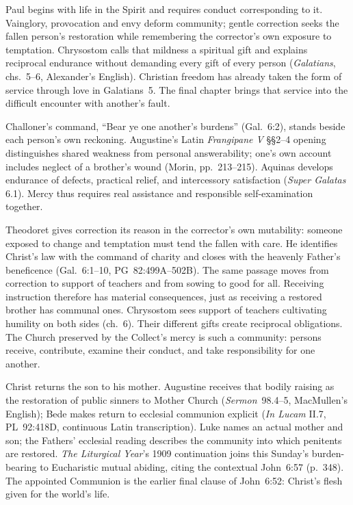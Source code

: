 Paul begins with life in the Spirit and requires conduct corresponding to
it. Vainglory, provocation and envy deform community; gentle correction
seeks the fallen person's restoration while remembering the corrector's
own exposure to temptation. Chrysostom calls that mildness a spiritual
gift and explains reciprocal endurance without demanding every gift of
every person (\emph{Galatians}, chs.~5--6, Alexander's English). Christian
freedom has already taken the form of service through love in Galatians~5.
The final chapter brings that service into the difficult encounter with
another's fault.

Challoner's command, ``Bear ye one another's burdens'' (Gal.~6:2), stands
beside each person's own reckoning. Augustine's Latin \emph{Frangipane V}
§§2--4 opening distinguishes shared weakness from personal answerability;
one's own account includes neglect of a brother's wound (Morin,
pp.~213--215). Aquinas develops endurance of defects, practical relief, and
intercessory satisfaction (\emph{Super Galatas} 6.1). Mercy thus requires
real assistance and responsible self-examination together.

Theodoret gives correction its reason in the corrector's own mutability:
someone exposed to change and temptation must tend the fallen with care.
He identifies Christ's law with the command of charity and closes with
the heavenly Father's beneficence (Gal.~6:1--10, PG~82:499A--502B).
The same passage moves from correction to support of teachers and from
sowing to good for all. Receiving instruction therefore has material
consequences, just as receiving a restored brother has communal ones.
Chrysostom sees support of teachers cultivating humility on both sides
(ch.~6). Their different gifts create reciprocal obligations. The Church
preserved by the Collect's mercy is such a community: persons receive,
contribute, examine their conduct, and take responsibility for one another.

Christ returns the son to his mother. Augustine receives that bodily
raising as the restoration of public sinners to Mother Church
(\emph{Sermon}~98.4--5, MacMullen's English); Bede makes return to
ecclesial communion explicit (\emph{In Lucam} II.7, PL~92:418D,
continuous Latin transcription). Luke names an actual mother and son;
the Fathers' ecclesial reading describes the community into which penitents
are restored. \emph{The Liturgical Year}'s 1909 continuation joins this
Sunday's burden-bearing to Eucharistic mutual abiding, citing the
contextual John~6:57 (p.~348). The appointed Communion is the earlier final
clause of John~6:52: Christ's flesh given for the world's life.

